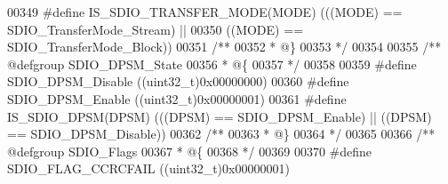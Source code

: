 \begin{DoxyCode}
00349 \textcolor{preprocessor}{#}\textcolor{preprocessor}{define} \textcolor{preprocessor}{IS\_SDIO\_TRANSFER\_MODE}\textcolor{preprocessor}{(}\textcolor{preprocessor}{MODE}\textcolor{preprocessor}{)} \textcolor{preprocessor}{(}\textcolor{preprocessor}{(}\textcolor{preprocessor}{(}\textcolor{preprocessor}{MODE}\textcolor{preprocessor}{)} \textcolor{preprocessor}{==} SDIO_TransferMode_Stream\textcolor{preprocessor}{)} \textcolor{preprocessor}{||}
00350                                      \textcolor{preprocessor}{(}\textcolor{preprocessor}{(}\textcolor{preprocessor}{MODE}\textcolor{preprocessor}{)} \textcolor{preprocessor}{==} SDIO_TransferMode_Block\textcolor{preprocessor}{)}\textcolor{preprocessor}{)}
00351 \textcolor{comment}{/**}
00352 \textcolor{comment}{  * @\}}
00353 \textcolor{comment}{  */}
00354 
00355 \textcolor{comment}{/** @defgroup SDIO\_DPSM\_State }
00356 \textcolor{comment}{  * @\{}
00357 \textcolor{comment}{  */}
00358 
00359 \textcolor{preprocessor}{#}\textcolor{preprocessor}{define} \textcolor{preprocessor}{SDIO\_DPSM\_Disable}                    \textcolor{preprocessor}{(}\textcolor{preprocessor}{(}\textcolor{preprocessor}{uint32\_t}\textcolor{preprocessor}{)}0x00000000\textcolor{preprocessor}{)}
00360 \textcolor{preprocessor}{#}\textcolor{preprocessor}{define} \textcolor{preprocessor}{SDIO\_DPSM\_Enable}                     \textcolor{preprocessor}{(}\textcolor{preprocessor}{(}\textcolor{preprocessor}{uint32\_t}\textcolor{preprocessor}{)}0x00000001\textcolor{preprocessor}{)}
00361 \textcolor{preprocessor}{#}\textcolor{preprocessor}{define} \textcolor{preprocessor}{IS\_SDIO\_DPSM}\textcolor{preprocessor}{(}\textcolor{preprocessor}{DPSM}\textcolor{preprocessor}{)} \textcolor{preprocessor}{(}\textcolor{preprocessor}{(}\textcolor{preprocessor}{(}\textcolor{preprocessor}{DPSM}\textcolor{preprocessor}{)} \textcolor{preprocessor}{==} SDIO_DPSM_Enable\textcolor{preprocessor}{)} \textcolor{preprocessor}{||} \textcolor{preprocessor}{(}\textcolor{preprocessor}{(}\textcolor{preprocessor}{DPSM}\textcolor{preprocessor}{)} \textcolor{preprocessor}{==} 
      SDIO_DPSM_Disable\textcolor{preprocessor}{)}\textcolor{preprocessor}{)}
00362 \textcolor{comment}{/**}
00363 \textcolor{comment}{  * @\}}
00364 \textcolor{comment}{  */}
00365 
00366 \textcolor{comment}{/** @defgroup SDIO\_Flags }
00367 \textcolor{comment}{  * @\{}
00368 \textcolor{comment}{  */}
00369 
00370 \textcolor{preprocessor}{#}\textcolor{preprocessor}{define} \textcolor{preprocessor}{SDIO\_FLAG\_CCRCFAIL}                  \textcolor{preprocessor}{(}\textcolor{preprocessor}{(}\textcolor{preprocessor}{uint32\_t}\textcolor{preprocessor}{)}0x00000001\textcolor{preprocessor}{)}

\end{DoxyCode}
